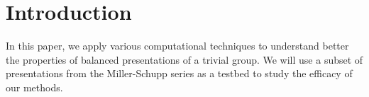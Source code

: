
\section{Introduction\label{sec:intro}}

In this paper, we apply various computational techniques to understand better the properties of balanced presentations of a trivial group. We will use a subset of presentations from the Miller-Schupp series as a testbed to study the efficacy of our methods. 